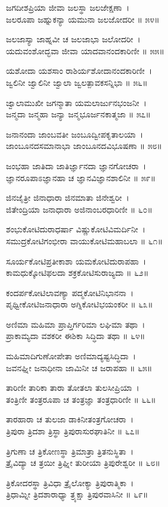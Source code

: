 ಜಗದೀಶಪ್ರಿಯಾ ಜೀವಾ ಜಲಸ್ಥಾ ಜಲಜೇಕ್ಷಣಾ~।\\
ಜಲರೂಪಾ ಜಹ್ನುಕನ್ಯಾ ಯಮುನಾ ಜಲಜೋದರೀ ॥ ೫೪॥

ಜಲಜಾಸ್ಯಾ ಜಾಹ್ನವೀ ಚ ಜಲಜಾಭಾ ಜಲೋದರೀ~।\\
ಯದುವಂಶೋದ್ಭವಾ ಜೀವಾ ಯಾದವಾನಂದಕಾರಿಣೀ ॥ ೫೫॥

ಯಶೋದಾ ಯಶಸಾಂ ರಾಶಿರ್ಯಶೋದಾನಂದಕಾರಿಣೀ~।\\
ಜ್ವಲಿನೀ ಜ್ವಾಲಿನೀ ಜ್ವಾಲಾ ಜ್ವಲತ್ಪಾವಕಸನ್ನಿಭಾ ॥ ೫೬॥

ಜ್ವಾಲಾಮುಖೀ ಜಗನ್ಮಾತಾ ಯಮಲಾರ್ಜುನಭಂಜನೀ~।\\
ಜನ್ಮದಾ ಜನ್ಮಹಾ ಜನ್ಯಾ ಜನ್ಮಭೂರ್ಜನಕಾತ್ಮಜಾ ॥ ೫೭॥

ಜನಾನಂದಾ ಜಾಂಬವತೀ ಜಂಬೂದ್ವೀಪಕೃತಾಲಯಾ~।\\
ಜಾಂಬೂನದಸಮಾನಾಭಾ ಜಾಂಬೂನದವಿಭೂಷಣಾ ॥ ೫೮॥

ಜಂಭಹಾ ಜಾತಿದಾ ಜಾತಿರ್ಜ್ಞಾನದಾ ಜ್ಞಾನಗೋಚರಾ~।\\
ಜ್ಞಾನರೂಪಾಽಜ್ಞಾನಹಾ ಚ ಜ್ಞಾನವಿಜ್ಞಾನಶಾಲಿನೀ ॥ ೫೯॥

ಜಿನಜೈತ್ರೀ ಜಿನಾಧಾರಾ ಜಿನಮಾತಾ ಜಿನೇಶ್ವರೀ~।\\
ಜಿತೇಂದ್ರಿಯಾ ಜನಾಧಾರಾ ಅಜಿನಾಂಬರಧಾರಿಣೀ ॥ ೬೦॥

ಶಂಭುಕೋಟಿದುರಾಧರ್ಷಾ ವಿಷ್ಣುಕೋಟಿವಿಮರ್ದಿನೀ~।\\
ಸಮುದ್ರಕೋಟಿಗಂಭೀರಾ ವಾಯುಕೋಟಿಮಹಾಬಲಾ ॥ ೬೧॥

ಸೂರ್ಯಕೋಟಿಪ್ರತೀಕಾಶಾ ಯಮಕೋಟಿದುರಾಪಹಾ~।\\
ಕಾಮಧುಕ್ಕೋಟಿಫಲದಾ ಶಕ್ರಕೋಟಿಸುರಾಜ್ಯದಾ ॥ ೬೨॥

ಕಂದರ್ಪಕೋಟಿಲಾವಣ್ಯಾ ಪದ್ಮಕೋಟಿನಿಭಾನನಾ~।\\
ಪೃಥ್ವೀಕೋಟಿಜನಾಧಾರಾ ಅಗ್ನಿಕೋಟಿಭಯಂಕರೀ ॥ ೬೩॥

ಅಣಿಮಾ ಮಹಿಮಾ ಪ್ರಾಪ್ತಿರ್ಗರಿಮಾ ಲಘಿಮಾ ತಥಾ~।\\
ಪ್ರಾಕಾಮ್ಯದಾ ವಶಕರೀ ಈಶಿಕಾ ಸಿದ್ಧಿದಾ ತಥಾ ॥ ೬೪॥

ಮಹಿಮಾದಿಗುಣೋಪೇತಾ ಅಣಿಮಾದ್ಯಷ್ಟಸಿದ್ಧಿದಾ~।\\
ಜವನಘ್ನೀ ಜನಾಧೀನಾ ಜಾಮಿನೀ ಚ ಜರಾಪಹಾ ॥ ೬೫॥

ತಾರಿಣೀ ತಾರಿಕಾ ತಾರಾ ತೋತಲಾ ತುಲಸೀಪ್ರಿಯಾ~।\\
ತಂತ್ರಿಣೀ ತಂತ್ರರೂಪಾ ಚ ತಂತ್ರಜ್ಞಾ ತಂತ್ರಧಾರಿಣೀ ॥ ೬೬॥

ತಾರಹಾರಾ ಚ ತುಲಜಾ ಡಾಕಿನೀತಂತ್ರಗೋಚರಾ~।\\
ತ್ರಿಪುರಾ ತ್ರಿದಶಾ ತ್ರಿಸ್ಥಾ ತ್ರಿಪುರಾಸುರಘಾತಿನೀ ॥ ೬೭॥

ತ್ರಿಗುಣಾ ಚ ತ್ರಿಕೋಣಸ್ಥಾ ತ್ರಿಮಾತ್ರಾ ತ್ರಿತನುಸ್ಥಿತಾ~।\\
ತ್ರೈವಿದ್ಯಾ ಚ ತ್ರಯೀ ತ್ರಿಘ್ನೀ ತುರೀಯಾ ತ್ರಿಪುರೇಶ್ವರೀ ॥ ೬೮॥

ತ್ರಿಕೋದರಸ್ಥಾ ತ್ರಿವಿಧಾ ತ್ರೈಲೋಕ್ಯಾ ತ್ರಿಪುರಾತ್ಮಿಕಾ~।\\
ತ್ರಿಧಾಮ್ನೀ ತ್ರಿದಶಾರಾಧ್ಯಾ ತ್ರ್ಯಕ್ಷಾ ತ್ರಿಪುರವಾಸಿನೀ ॥ ೬೯॥


